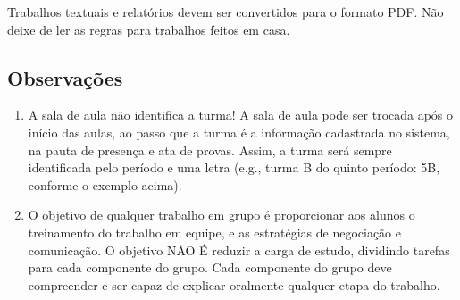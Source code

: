 \documentclass[a4paper]{article}
\begin{document}
Trabalhos textuais e relatórios devem ser convertidos para o formato
PDF. Não deixe de ler as regras para trabalhos feitos em casa.

\subsection{Observações}

\begin{enumerate}
\item A sala de aula não identifica a turma! A sala de aula pode ser
  trocada após o início das aulas, ao passo que a turma é a informação
  cadastrada no sistema, na pauta de presença e ata de provas. Assim,
  a turma será sempre identificada pelo período e uma letra (e.g.,
  turma B do quinto período: 5B, conforme o exemplo acima).
\item O objetivo de qualquer trabalho em grupo é proporcionar aos
  alunos o treinamento do trabalho em equipe, e as estratégias de
  negociação e comunicação. O objetivo NÃO É reduzir a carga de
  estudo, dividindo tarefas para cada componente do grupo. Cada
  componente do grupo deve compreender e ser capaz de explicar
  oralmente qualquer etapa do trabalho.

\end{enumerate}

 
\end{document}
